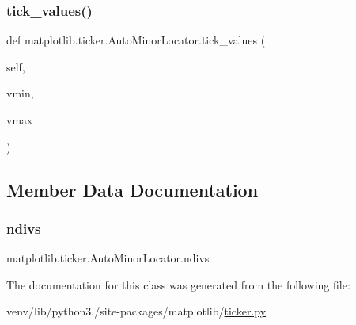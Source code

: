 \subsubsection{\texorpdfstring{tick\+\_\+values()}{tick\_values()}}
{\footnotesize\ttfamily def matplotlib.\+ticker.\+Auto\+Minor\+Locator.\+tick\+\_\+values (\begin{DoxyParamCaption}\item[{}]{self,  }\item[{}]{vmin,  }\item[{}]{vmax }\end{DoxyParamCaption})}



\subsection{Member Data Documentation}
\mbox{\label{classmatplotlib_1_1ticker_1_1AutoMinorLocator_a0e154b92e34e9a618bd671f0eb036c63}} 
\subsubsection{\texorpdfstring{ndivs}{ndivs}}
{\footnotesize\ttfamily matplotlib.\+ticker.\+Auto\+Minor\+Locator.\+ndivs}



The documentation for this class was generated from the following file\+:\begin{DoxyCompactItemize}
\item 
venv/lib/python3./site-\/packages/matplotlib/\hyperlink{ticker_8py}{ticker.\+py}\end{DoxyCompactItemize}
